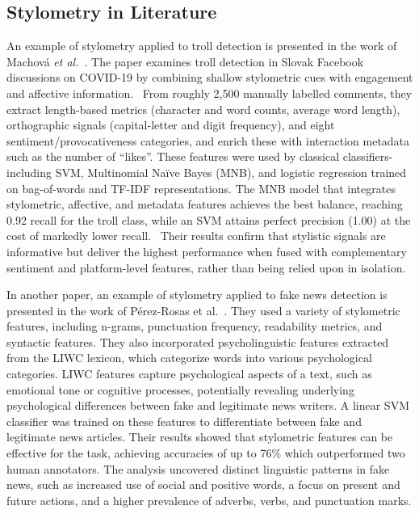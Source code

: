 \documentclass[twoside]{ctuthesis}
\theoremstyle{plain}
\theoremstyle{definition}
\theoremstyle{note}
\begin{document}
\subsection{Stylometry in Literature}

An example of stylometry applied to troll detection is presented in the work of Machová \textit{et al.}~\cite{Machova2021Algorithms}. The paper examines troll detection in Slovak Facebook discussions on COVID-19 by combining shallow stylometric cues with engagement and affective information.  From roughly 2,500 manually labelled comments, they extract length-based metrics (character and word counts, average word length), orthographic signals (capital-letter and digit frequency), and eight sentiment/provocativeness categories, and enrich these with interaction metadata such as the number of “likes”. These features were used by classical classifiers-including SVM, Multinomial Naïve Bayes (MNB), and logistic regression trained on bag-of-words and TF-IDF representations. The MNB model that integrates stylometric, affective, and metadata features achieves the best balance, reaching 0.92 recall for the troll class, while an SVM attains perfect precision (1.00) at the cost of markedly lower recall.  Their results confirm that stylistic signals are informative but deliver the highest performance when fused with complementary sentiment and platform-level features, rather than being relied upon in isolation.

In another paper, an example of stylometry applied to fake news detection is presented in the work of Pérez-Rosas et al.~\cite{PerezRosas2018Stylometry}. They used a variety of stylometric features, including n-grams, punctuation frequency, readability metrics, and syntactic features. They also incorporated psycholinguistic features extracted from the LIWC lexicon, which categorize words into various psychological categories. LIWC features capture psychological aspects of a text, such as emotional tone or cognitive processes, potentially revealing underlying psychological differences between fake and legitimate news writers. A linear SVM classifier was trained on these features to differentiate between fake and legitimate news articles. Their results showed that stylometric features can be effective for the task, achieving accuracies of up to 76\% which outperformed two human annotators. The analysis uncovered distinct linguistic patterns in fake news, such as increased use of social and positive words, a focus on present and future actions, and a higher prevalence of adverbs, verbs, and punctuation marks.\par
\end{document}
